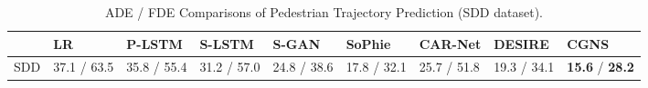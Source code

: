 \documentclass[letterpaper, 10 pt, conference]{ieeeconf}
\begin{document}
\begin{table*}[!tbp]
	\small
	\label{tab:feature}
	\caption{ADE / FDE Comparisons of Pedestrian Trajectory Prediction (SDD dataset).}
	\vspace{-0.5cm}
	\begin{center}
		\begin{tabular}{m{1.2cm}<{\centering}| m{1.5cm}<{\centering}| m{1.5cm}<{\centering}| m{1.5cm}<{\centering}| m{1.5cm}<{\centering}| m{1.5cm}<{\centering}| m{1.5cm}<{\centering}| m{1.5cm}<{\centering}| m{1.5cm}<{\centering} }
			\toprule
			\midrule
			& LR & P-LSTM & S-LSTM & S-GAN  & SoPhie & CAR-Net & DESIRE & \textbf{CGNS}\\ \midrule
			SDD     & 37.1 / 63.5 & 35.8 / 55.4 & 31.2 / 57.0 & 24.8 / 38.6 & 17.8 / 32.1 & 25.7 / 51.8 & 19.3 / 34.1 & \textbf{15.6} / \textbf{28.2}\\   
			\bottomrule
		\end{tabular}
	\end{center}
	\vspace{-0.4cm}
\end{table*}
\vspace*{-0.5cm}
\end{document}
